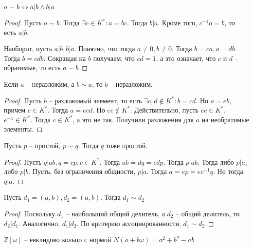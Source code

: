 \documentclass{article}
\begin{document}
\begin{statement}
    $a \sim b \Leftrightarrow a | b \wedge b | a$
\end{statement}

\begin{proof}
    Пусть $a \sim b$. Тогда $\exists c \in K^*: a = bc$. Тогда $b | a$. Кроме того, $c^{-1}a = b$, то есть $a | b$.

    Наоборот, пусть $a | b, b | a$. Понятно, что тогда $a \neq 0, b \neq 0$. Тогда $b = ca, a = db$. Тогда $b = cdb$.
    Сокращая на $b$ получаем, что $cd = 1$, а это означает, что $c$ и $d$ -- обратимые, то есть $a \sim b$
\end{proof}

\begin{statement}
    Если $a$ -- неразложим, а $b \sim a$, то $b$ -- неразложим.
\end{statement}

\begin{proof}
    Пусть $b$ -- разложимый элемент, то есть $\exists c, d \not \in K^*: b = cd$. Но $a = eb$, причем $e \in K^*$. Тогда
    $a = ecd$. Но $ec \not \in K^*$. Действительно, пусть $ec \in K^*$. $e^{-1} \in K^*$. Тогда $c \in K^*$, а это не
    так. Получили разложения для $a$ на необратимые элементы.
\end{proof}

\begin{statement}
    Пусть $p$ -- простой, $p \sim q$. Тогда $q$ тоже простой.
\end{statement}

\begin{proof}
    Пусть $q | ab, q = cp, c \in K^*$. Тогда $ab = dq = cdp$. Тогда $p | ab$. Тогда либо $p | a$, либо $p | b$. Пусть,
    без ограничения общности, $p | a$. Тогда $a = ep = e c^{-1}q$. Но тогда $q | a$.
\end{proof}

\begin{statement}
    Пусть $d_1 = (a, b), d_2 = (a, b)$. Тогда $d_1 \sim d_2$
\end{statement}

\begin{proof}
    Поскольку $d_1$ -- наибольший общий делитель, а $d_2$ -- общий делитель, то $d_2 | d_1$. Аналогично, $d_1 | d_2$. По
    критерию ассоциированности, $d_1 \sim d_2$
\end{proof}

\begin{statement}
    $\mathbb{Z}[\omega]$ -- евклидово кольцо с нормой $N(a + b \omega) = a^2 + b^2 - ab$
\end{statement}
\end{document}
